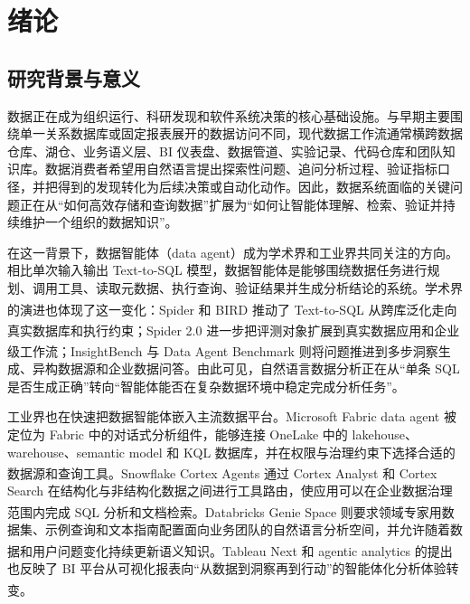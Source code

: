 \documentclass[
    bachelor,
    pdflinks,
]{xjtuthesis}
\newcommand{\upcite}[1]{\textsuperscript{\cite{#1}}}
\begin{document}
\xjtuchead
\setcounter{page}{1}
\xjtucinfopage
\xjtueinfopage
\xjtutoc
\clearpage

\xjtucontent

\chapter{绪论}

\section{研究背景与意义}

数据正在成为组织运行、科研发现和软件系统决策的核心基础设施。与早期主要围绕单一关系数据库或固定报表展开的数据访问不同，现代数据工作流通常横跨数据仓库、湖仓、业务语义层、BI 仪表盘、数据管道、实验记录、代码仓库和团队知识库。数据消费者希望用自然语言提出探索性问题、追问分析过程、验证指标口径，并把得到的发现转化为后续决策或自动化动作。因此，数据系统面临的关键问题正在从“如何高效存储和查询数据”扩展为“如何让智能体理解、检索、验证并持续维护一个组织的数据知识”。

在这一背景下，数据智能体（data agent）成为学术界和工业界共同关注的方向。相比单次输入输出 Text-to-SQL 模型，数据智能体是能够围绕数据任务进行规划、调用工具、读取元数据、执行查询、验证结果并生成分析结论的系统。学术界的演进也体现了这一变化：Spider\upcite{yu2018spider} 和 BIRD\upcite{li2023bird} 推动了 Text-to-SQL 从跨库泛化走向真实数据库和执行约束；Spider 2.0\upcite{lei2025spider2} 进一步把评测对象扩展到真实数据应用和企业级工作流；InsightBench\upcite{sahu2025insightbench} 与 Data Agent Benchmark\upcite{dab2026dataAgentBench} 则将问题推进到多步洞察生成、异构数据源和企业数据问答。由此可见，自然语言数据分析正在从“单条 SQL 是否生成正确”转向“智能体能否在复杂数据环境中稳定完成分析任务”。

工业界也在快速把数据智能体嵌入主流数据平台。Microsoft Fabric data agent 被定位为 Fabric 中的对话式分析组件，能够连接 OneLake 中的 lakehouse、warehouse、semantic model 和 KQL 数据库，并在权限与治理约束下选择合适的数据源和查询工具\upcite{microsoft2026fabricDataAgent}。Snowflake Cortex Agents 通过 Cortex Analyst 和 Cortex Search 在结构化与非结构化数据之间进行工具路由，使应用可以在企业数据治理范围内完成 SQL 分析和文档检索\upcite{snowflake2026cortexAgents}。Databricks Genie Space 则要求领域专家用数据集、示例查询和文本指南配置面向业务团队的自然语言分析空间，并允许随着数据和用户问题变化持续更新语义知识\upcite{databricks2026genieSpace}。Tableau Next 和 agentic analytics 的提出也反映了 BI 平台从可视化报表向“从数据到洞察再到行动”的智能体化分析体验转变\upcite{tableau2025agenticAnalytics}。
\end{document}
